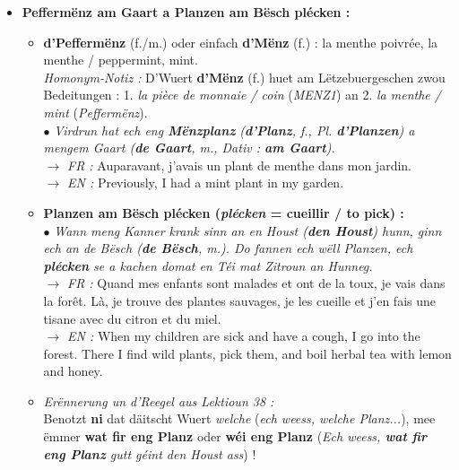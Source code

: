 \begin{itemize}
    \vspace{0.3em}

    \item \textbf{Peffermënz am Gaart a Planzen am Bësch plécken :}
    \begin{itemize}
        \item \textbf{d'Peffermënz} (f./m.) oder einfach \textbf{d'Mënz} (f.) : la menthe poivrée, la menthe / peppermint, mint. \\
        \textit{Homonym-Notiz :} D'Wuert \textbf{d'Mënz} (f.) huet am Lëtzebuergeschen zwou Bedeitungen : 1. \textit{la pièce de monnaie / coin} (\textit{MENZ1}) an 2. \textit{la menthe / mint} (\textit{Peffermënz}). \\
        $\bullet$ \textit{Virdrun hat ech eng \textbf{Mënzplanz} (\textbf{d'Planz}, f., Pl. \textbf{d'Planzen}) a mengem Gaart (\textbf{de Gaart}, m., Dativ : \textbf{am Gaart}).} \\
        $\rightarrow$ \textit{FR :} Auparavant, j'avais un plant de menthe dans mon jardin. \\
        $\rightarrow$ \textit{EN :} Previously, I had a mint plant in my garden.
        \item \textbf{Planzen am Bësch plécken (\textit{plécken} = cueillir / to pick) :} \\
        $\bullet$ \textit{Wann meng Kanner krank sinn an en Houst (\textbf{den Houst}) hunn, ginn ech an de Bësch (\textbf{de Bësch}, m.). Do fannen ech wëll Planzen, ech \textbf{plécken} se a kachen domat en Téi mat Zitroun an Hunneg.} \\
        $\rightarrow$ \textit{FR :} Quand mes enfants sont malades et ont de la toux, je vais dans la forêt. Là, je trouve des plantes sauvages, je les cueille et j'en fais une tisane avec du citron et du miel. \\
        $\rightarrow$ \textit{EN :} When my children are sick and have a cough, I go into the forest. There I find wild plants, pick them, and boil herbal tea with lemon and honey.
        \item \textit{Erënnerung un d'Reegel aus Lektioun 38 :} \\
        Benotzt \textbf{ni} dat däitscht Wuert \textit{\flqq *welche\frqq} (\textit{\flqq *ech weess, welche Planz...\frqq}), mee ëmmer \textbf{wat fir eng Planz} oder \textbf{wéi eng Planz} (\textit{Ech weess, \textbf{wat fir eng Planz} gutt géint den Houst ass}) !
    \end{itemize}
\end{itemize}

